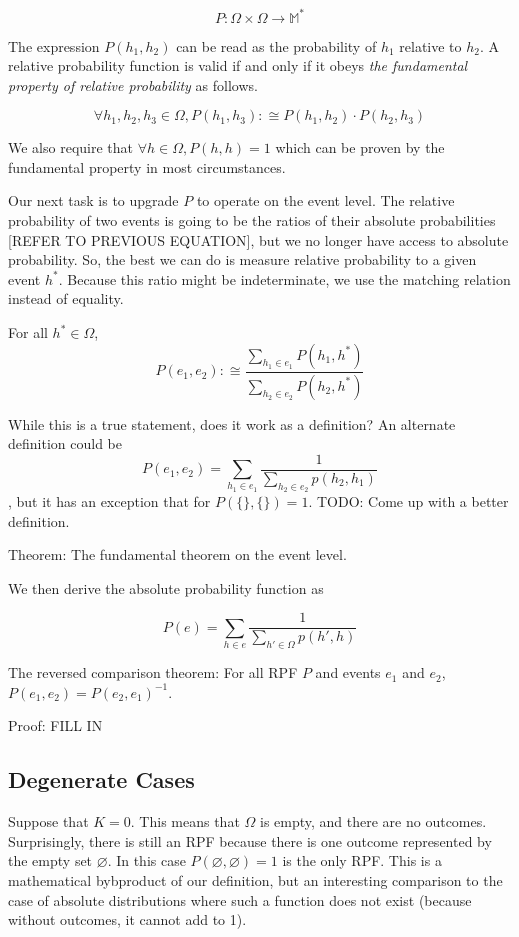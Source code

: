 \documentclass[twoside]{article}
\begin{document}
\[P: \Omega \times \Omega \rightarrow \mathbb{M}^*\]

The expression \(P(h_1, h_2)\) can be read as the probability of \(h_1\) relative to \(h_2\). A relative probability function is valid if and only if it obeys \textit{the fundamental property of relative probability} as follows.

\begin{equation}
\label{eq:fundamental}
\forall h_1, h_2, h_3 \in \Omega, P(h_1, h_3) :\cong P(h_1, h_2) \cdot P(h_2, h_3)
\end{equation}

We also require that \(\forall h \in \Omega, P(h, h) = 1\) which can be proven by the fundamental property in most circumstances.

Our next task is to upgrade \(P\) to operate on the event level. The relative probability of two events is going to be the ratios of their absolute probabilities [REFER TO PREVIOUS EQUATION], but we no longer have access to absolute probability. So, the best we can do is measure relative probability to a given event \(h^*\). Because this ratio might be indeterminate, we use the matching relation instead of equality.

For all \(h^* \in \Omega\), \[P(e_1, e_2) :\cong \frac{\sum_{h_1 \in e_1} P(h_1, h^*)}{\sum_{h_2 \in e_2} P(h_2, h^*)}\]

While this is a true statement, does it work as a definition? An alternate definition could be \[P(e_1, e_2) = \sum_{h_1 \in e_1} \frac{1}{\sum_{h_2 \in e_2} p(h_2, h_1)}\], but it has an exception that for \(P(\{\},\{\}) = 1\). TODO: Come up with a better definition.

Theorem: The fundamental theorem on the event level.

We then derive the absolute probability function as

\[P(e) = \sum_{h \in e} \frac{1}{\sum_{h' \in \Omega}p(h', h)}\]

The reversed comparison theorem: For all RPF \(P\) and events \(e_1\) and \(e_2\), \(P(e_1, e_2) = P(e_2, e_1)^{-1}\).

Proof: FILL IN

\subsection{Degenerate Cases}

Suppose that \(K = 0\). This means that \(\Omega\) is empty, and there are no outcomes. Surprisingly, there is still an RPF because there is one outcome represented by the empty set \(\varnothing\). In this case \(P(\varnothing, \varnothing) = 1\) is the only RPF. This is a mathematical bybproduct of our definition, but an interesting comparison to the case of absolute distributions where such a function does not exist (because without outcomes, it cannot add to 1).
\end{document}
